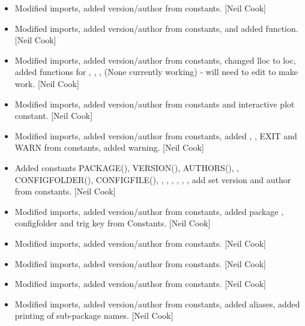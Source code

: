 \documentclass[a4paper,10pt,english]{report}
\begin{document}
\begin{itemize}
\item {} 
Modified imports, added version/author from constants. {[}Neil Cook{]}

\item {} 
Modified imports, added version/author from constants, and added
 function. {[}Neil Cook{]}

\item {} 
Modified imports, added version/author from constants, changed lloc to
loc, added functions for , ,
,  (None currently working) -
will need to edit  to make work. {[}Neil Cook{]}

\item {} 
Modified imports, added version/author from constants and interactive
plot constant. {[}Neil Cook{]}

\item {} 
Modified imports, added version/author from constants, added ,
, EXIT and WARN from constants, added 
warning. {[}Neil Cook{]}

\item {} 
Added constants PACKAGE(), VERSION(), AUTHORS(), ,
CONFIGFOLDER(), CONFIGFILE(), ,
, , ,
, , add set version and author
from constants. {[}Neil Cook{]}

\item {} 
Modified imports, added version/author from constants, added package
, configfolder and trig key from Constants. {[}Neil Cook{]}

\item {} 
Modified imports, added version/author from constants. {[}Neil Cook{]}

\item {} 
Modified imports, added version/author from constants. {[}Neil Cook{]}

\item {} 
Modified imports, added version/author from constants. {[}Neil Cook{]}

\item {} 
Modified imports, added version/author from constants, added 
aliases, added printing of sub-package names. {[}Neil Cook{]}


\end{itemize}
\end{document}
